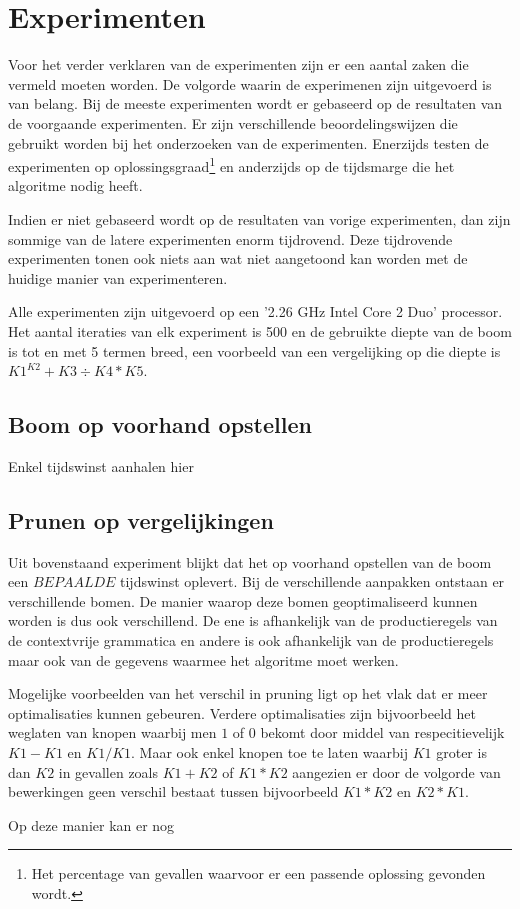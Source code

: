 \documentclass[Main.tex]{subfiles}
\begin{document}
\section{Experimenten}
Voor het verder verklaren van de experimenten zijn er een aantal zaken die vermeld moeten worden. De volgorde waarin de experimenen zijn uitgevoerd is van belang. Bij de meeste experimenten wordt er gebaseerd op de resultaten van de voorgaande experimenten. Er zijn verschillende beoordelingswijzen die gebruikt worden bij het onderzoeken van de experimenten. Enerzijds testen de experimenten op oplossingsgraad\footnote{Het percentage van gevallen waarvoor er een passende oplossing gevonden wordt.} en anderzijds op de tijdsmarge die het algoritme nodig heeft. 
\par
Indien er niet gebaseerd wordt op de resultaten van vorige experimenten, dan zijn sommige van de latere experimenten enorm tijdrovend. Deze tijdrovende experimenten tonen ook niets aan wat niet aangetoond kan worden met de huidige manier van experimenteren.
\par
Alle experimenten zijn uitgevoerd op een '2.26 GHz Intel Core 2 Duo' processor. Het aantal iteraties van elk experiment is 500 en de gebruikte diepte van de boom is tot en met 5 termen breed, een voorbeeld van een vergelijking op die diepte is $K1^{K2}+K3 \div K4*K5$.

\subsection{Boom op voorhand opstellen}

Enkel tijdswinst aanhalen hier %

\subsection{Prunen op vergelijkingen}

Uit bovenstaand experiment blijkt dat het op voorhand opstellen van de boom een $BEPAALDE$ tijdswinst oplevert. Bij de verschillende aanpakken ontstaan er verschillende bomen. De manier waarop deze bomen geoptimaliseerd kunnen worden is dus ook verschillend. De ene is afhankelijk van de productieregels van de contextvrije grammatica en andere is ook afhankelijk van de productieregels maar ook van de gegevens waarmee het algoritme moet werken. 
\par 
Mogelijke voorbeelden van het verschil in pruning ligt op het vlak dat er meer optimalisaties kunnen gebeuren. Verdere optimalisaties zijn bijvoorbeeld het weglaten van knopen waarbij men $1$ of $0$ bekomt door middel van respecitievelijk $K1-K1$ en $K1/K1$. Maar ook enkel knopen toe te laten waarbij $K1$ groter is dan $K2$ in gevallen zoals $K1+K2$ of $K1*K2$ aangezien er door de volgorde van bewerkingen geen verschil bestaat tussen bijvoorbeeld $K1*K2$ en $K2*K1$.
\par 
Op deze manier kan er nog 
\end{document}
